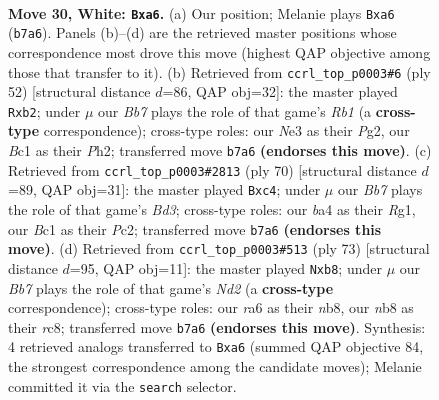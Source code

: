 \documentclass[11pt]{article}
\begin{document}
\clearpage

\begin{figure}[p]\centering
\begin{subfigure}{0.46\textwidth}\centering
\resizebox{\linewidth}{!}{%
\newchessgame
\chessboard[
  setfen={1n3r1k/1B4b1/rP3n2/p7/b1P1p3/4NNP1/4R3/1RB3K1 w - - 0 30},
  showmover=false,
  pgfstyle=straightmove, color=movearrow, markmove={b7-a6}
]}
\caption{}
\end{subfigure}\hfill
\begin{subfigure}{0.46\textwidth}\centering
\resizebox{\linewidth}{!}{%
\newchessgame
\chessboard[
  setfen={4r1k1/3RB2p/1pN1p1p1/1n6/5P2/2b5/1r4PP/1R4K1 w - - 4 27},
  showmover=false,
  pgfstyle=straightmove, color=movearrow, markmove={b1-b2}
]}
\caption{}
\end{subfigure}
\\[4pt]
\begin{subfigure}{0.46\textwidth}\centering
\resizebox{\linewidth}{!}{%
\newchessgame
\chessboard[
  setfen={4rr1k/4N2p/3p1n2/P7/2nN1p2/3B3b/2P5/R1K3R1 w - - 0 36},
  showmover=false,
  pgfstyle=straightmove, color=movearrow, markmove={d3-c4}
]}
\caption{}
\end{subfigure}\hfill
\begin{subfigure}{0.46\textwidth}\centering
\resizebox{\linewidth}{!}{%
\newchessgame
\chessboard[
  setfen={1NR2b2/3n1k1p/8/3rp1p1/bpN5/4BP2/1P3KPP/8 b - - 9 37},
  showmover=false,
  pgfstyle=straightmove, color=movearrow, markmove={d7-b8}
]}
\caption{}
\end{subfigure}
\caption{\textbf{Move 30, White: \texttt{Bxa6}.} (a) Our position; Melanie plays \texttt{Bxa6} (\texttt{b7a6}). Panels (b)--(d) are the retrieved master positions whose correspondence most drove this move (highest QAP objective among those that transfer to it). (b) Retrieved from \texttt{ccrl\_top\_p0003\#6} (ply 52) [structural distance $d$=86, QAP obj=32]: the master played \texttt{Rxb2}; under $\mu$ our \emph{Bb7} plays the role of that game's \emph{Rb1} (a \textbf{cross-type} correspondence); cross-type roles: our \emph{N}e3 as their \emph{P}g2, our \emph{B}c1 as their \emph{P}h2; transferred move \texttt{b7a6} \textbf{(endorses this move)}. (c) Retrieved from \texttt{ccrl\_top\_p0003\#2813} (ply 70) [structural distance $d$=89, QAP obj=31]: the master played \texttt{Bxc4}; under $\mu$ our \emph{Bb7} plays the role of that game's \emph{Bd3}; cross-type roles: our \emph{b}a4 as their \emph{R}g1, our \emph{B}c1 as their \emph{P}c2; transferred move \texttt{b7a6} \textbf{(endorses this move)}. (d) Retrieved from \texttt{ccrl\_top\_p0003\#513} (ply 73) [structural distance $d$=95, QAP obj=11]: the master played \texttt{Nxb8}; under $\mu$ our \emph{Bb7} plays the role of that game's \emph{Nd2} (a \textbf{cross-type} correspondence); cross-type roles: our \emph{r}a6 as their \emph{n}b8, our \emph{n}b8 as their \emph{r}c8; transferred move \texttt{b7a6} \textbf{(endorses this move)}. Synthesis: 4 retrieved analogs transferred to \texttt{Bxa6} (summed QAP objective 84, the strongest correspondence among the candidate moves); Melanie committed it via the \texttt{search} selector.}
\label{fig:thought-m58}
\end{figure}
\end{document}
